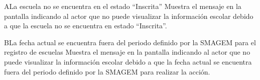 
 \begin{UCtrayectoriaA}{A}{La escuela no se encuentra en el estado ``Inscrita''}
    \UCpaso[\UCsist] Muestra el mensaje  en la pantalla  indicando al actor que no puede visualizar la información escolar debido a que la escuela no se encuentra en estado ``Inscrita''.
 \end{UCtrayectoriaA}

 \begin{UCtrayectoriaA}{B}{La fecha actual se encuentra fuera del periodo definido por la SMAGEM para el registro de escuelas}
    \UCpaso[\UCsist] Muestra el mensaje  en la pantalla  indicando al actor que no puede visualizar la información escolar debido a que la fecha actual se encuentra fuera del periodo definido por la SMAGEM para realizar la acción.
 \end{UCtrayectoriaA}

